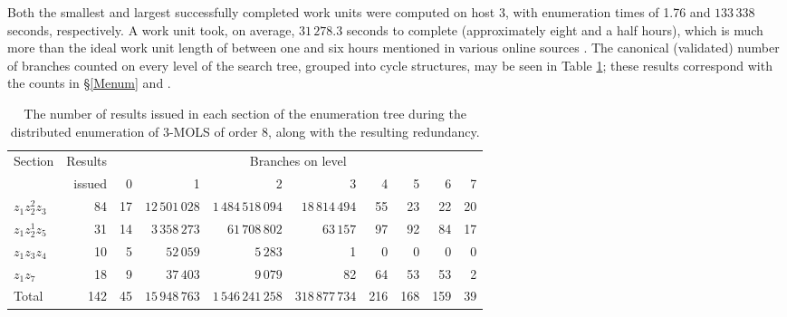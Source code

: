Both the smallest and largest successfully completed work units were computed on host 3, with enumeration times of 1.76 and $133\,338$ seconds, respectively. 
A work unit took, on average,  $31\,278.3$ seconds to complete (approximately eight and a half hours), which is much more than the ideal work unit length of between one and six hours mentioned in various online sources  \cite{boincblog}. The canonical (validated) number of branches counted on every level of the search tree, grouped into cycle structures,  may be seen in  Table \ref{83naivebranches}; these results correspond with  the counts in \S\ref{Menum} and \cite[p. 114]{Kidd2012}.  
  \begin{table}[htb]
 \centering
 \caption{The number of results issued in each section of the enumeration tree during the distributed enumeration of 3-MOLS of order 8, along with the resulting redundancy.}
\begin{tabular}{lrrrrrrrrr}
\toprule
Section & Results  &  \multicolumn{8}{c}{Branches on level} \\
\cmidrule(lr){3-10}
 &issued &   0 & 1 & 2 & 3 & 4 & 5 & 6 & 7     \\ \midrule 
$z_1z_2^2z_3$ & 84  &17 & $12\,501\,028$ & $1\,484\,518\,094$ & $18\,814\,494$ & 55 & 23 & 22 & 20  \\ 
$z_1z_2^1z_5$ &31 &14 & $3\,358\,273$ & $61\,708\,802$ & $63\,157$ & 97 & 92 & 84 & 17   \\ 
$z_1z_3z_4$& 10 &5 & $52\,059$ & $5\,283$ & 1 & 0 & 0 & 0 & 0   \\ 
$z_1z_7$ & 18 &9 & $37\,403$ & $9\,079$ & 82 & 64 & 53 & 53 & 2   \\ \midrule
Total &142 &45 & $15\,948\,763$ & $1\,546\,241\,258$ & $318\,877\,734$ & 216 & 168 & 159 & 39  \\ \bottomrule
\end{tabular}
\label{83naivebranches}
\end{table}

